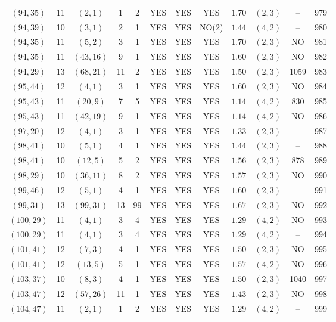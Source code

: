 \begin{longtable}{|c|c|c|c|c|c|c|c|c|c|c|c|}
$(94,35)$ & 11 & $(2,1)$ & 1 & 2 & YES & YES & YES & $1.70$ & $(2,3)$ & -- & 979\\
$(94,39)$ & 10 & $(3,1)$ & 2 & 1 & YES & YES & NO(2) & $1.44$ & $(4,2)$ & -- & 980\\
$(94,35)$ & 11 & $(5,2)$ & 3 & 1 & YES & YES & YES & $1.70$ & $(2,3)$ & NO & 981\\
$(94,35)$ & 11 & $(43,16)$ & 9 & 1 & YES & YES & YES & $1.60$ & $(2,3)$ & NO & 982\\
$(94,29)$ & 13 & $(68,21)$ & 11 & 2 & YES & YES & YES & $1.50$ & $(2,3)$ & 1059 & 983\\
$(95,44)$ & 12 & $(4,1)$ & 3 & 1 & YES & YES & YES & $1.60$ & $(2,3)$ & NO & 984\\
$(95,43)$ & 11 & $(20,9)$ & 7 & 5 & YES & YES & YES & $1.14$ & $(4,2)$ & 830 & 985\\
$(95,43)$ & 11 & $(42,19)$ & 9 & 1 & YES & YES & YES & $1.14$ & $(4,2)$ & NO & 986\\
$(97,20)$ & 12 & $(4,1)$ & 3 & 1 & YES & YES & YES & $1.33$ & $(2,3)$ & -- & 987\\
$(98,41)$ & 10 & $(5,1)$ & 4 & 1 & YES & YES & YES & $1.44$ & $(2,3)$ & -- & 988\\
$(98,41)$ & 10 & $(12,5)$ & 5 & 2 & YES & YES & YES & $1.56$ & $(2,3)$ & 878 & 989\\
$(98,29)$ & 10 & $(36,11)$ & 8 & 2 & YES & YES & YES & $1.57$ & $(2,3)$ & NO & 990\\
$(99,46)$ & 12 & $(5,1)$ & 4 & 1 & YES & YES & YES & $1.60$ & $(2,3)$ & -- & 991\\
$(99,31)$ & 13 & $(99,31)$ & 13 & 99 & YES & YES & YES & $1.67$ & $(2,3)$ & NO & 992\\
$(100,29)$ & 11 & $(4,1)$ & 3 & 4 & YES & YES & YES & $1.29$ & $(4,2)$ & NO & 993\\
$(100,29)$ & 11 & $(4,1)$ & 3 & 4 & YES & YES & YES & $1.29$ & $(4,2)$ & -- & 994\\
$(101,41)$ & 12 & $(7,3)$ & 4 & 1 & YES & YES & YES & $1.50$ & $(2,3)$ & NO & 995\\
$(101,41)$ & 12 & $(13,5)$ & 5 & 1 & YES & YES & YES & $1.57$ & $(4,2)$ & NO & 996\\
$(103,37)$ & 10 & $(8,3)$ & 4 & 1 & YES & YES & YES & $1.50$ & $(2,3)$ & 1040 & 997\\
$(103,47)$ & 12 & $(57,26)$ & 11 & 1 & YES & YES & YES & $1.43$ & $(2,3)$ & NO & 998\\
$(104,47)$ & 11 & $(2,1)$ & 1 & 2 & YES & YES & YES & $1.29$ & $(4,2)$ & -- & 999\\

\end{longtable}
